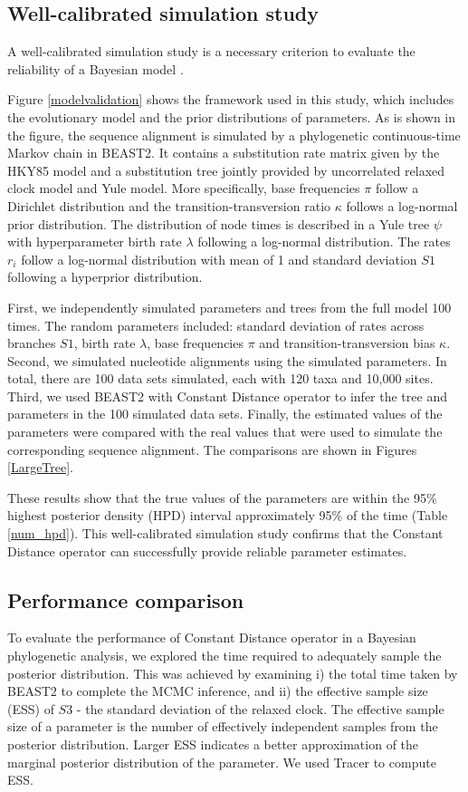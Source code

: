 \documentclass{bmcart}
\begin{document}
\subsection*{Well-calibrated simulation study}
A well-calibrated simulation study is a necessary criterion to evaluate the reliability of a Bayesian model \cite{dawid1982well}.

Figure \ref{modelvalidation} shows the framework used in this study, which includes the evolutionary model and the prior distributions of parameters. As is shown in the figure, the sequence alignment is simulated by a phylogenetic continuous-time Markov chain in BEAST2. It contains a substitution rate matrix given by the HKY85 \cite{hasegawa1985dating} model and a substitution tree jointly provided by uncorrelated relaxed clock model and Yule model. More specifically, base frequencies $\pi$ follow a Dirichlet distribution and the transition-transversion ratio $\kappa$ follows a log-normal prior distribution. The distribution of node times is described in a Yule tree $\psi$ with hyperparameter birth rate $\lambda $ following a log-normal distribution. The rates $r_i$ follow a log-normal distribution with mean of 1 and standard deviation $S1$ following a hyperprior distribution.

First, we independently simulated parameters and trees from the full model 100 times. The random parameters included: standard deviation of rates across branches $S1$, birth rate $\lambda $, base frequencies $\pi$ and transition-transversion bias $\kappa$. Second, we simulated nucleotide alignments using the simulated parameters. In total, there are 100 data sets simulated, each with 120 taxa and 10,000 sites. Third, we used BEAST2 with Constant Distance operator to infer the tree and parameters in the 100 simulated data sets. Finally, the estimated values of the parameters were compared with the real values that were used to simulate the corresponding sequence alignment. The comparisons are shown in Figures \ref{LargeTree}.

These results show that the true values of the parameters are within the 95\% highest posterior density (HPD) interval approximately 95\% of the time (Table \ref{num_hpd}). This well-calibrated simulation study confirms that the Constant Distance operator can successfully provide reliable parameter estimates.

\subsection*{Performance comparison}
To evaluate the performance of Constant Distance operator in a Bayesian phylogenetic analysis, we explored the time required to adequately sample the posterior distribution. This was achieved by examining i) the total time taken by BEAST2 to complete the MCMC inference, and ii) the effective sample size (ESS) of $S3$ - the standard deviation of the relaxed clock. The effective sample size of a parameter is the number of effectively independent samples from the posterior distribution. Larger ESS indicates a better approximation of the marginal posterior distribution of the parameter. We used Tracer \cite{Tracer} to compute ESS.
\end{document}
